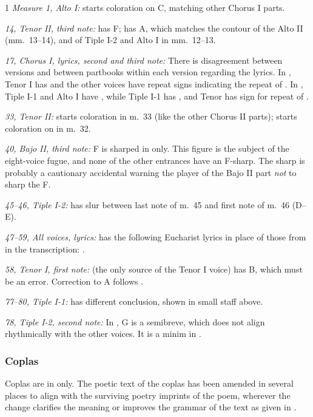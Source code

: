 \bigskip
\begin{hangparas}{\myparindent}{1}
%
\emph{Measure 1, Alto I: } 
 starts coloration on C, matching other Chorus I parts.

\emph{14, Tenor II, third note: } 
 has F;  has A, which matches the contour of the Alto II (mm.~13--14), and of Tiple I-2 and Alto I in mm.~12--13.

\emph{17, Chorus I, lyrics, second and third note: } 
There is disagreement between versions and between partbooks within each version regarding the lyrics.
In , Tenor I has  and the other voices have repeat signs indicating the repeat of .
In , Tiple I-1 and Alto I have , while Tiple I-1 has , and Tenor has sign for repeat of .

\emph{33, Tenor II: }
 starts coloration in m.~33 (like the other Chorus II parts);  starts coloration on  in m.~32.

\emph{40, Bajo II, third note: }
F is sharped in  only. 
This figure is the subject of the eight-voice fugue, and none of the other entrances have an F-sharp. 
The sharp is probably a cautionary accidental warning the player of the Bajo II part \emph{not} to sharp the F.

\emph{45--46, Tiple I-2: }
 has slur between last note of m.~45 and first note of m.~46 (D--E).

\emph{47--59, All voices, lyrics: }
 has the following Eucharist lyrics in place of those from  in the transcription: . 

\emph{58, Tenor I, first note: }
 (the only source of the Tenor I voice) has B, which must be an error. Correction to A follows .

\emph{77--80, Tiple I-1: }
 has different conclusion, shown in small staff above.

\emph{78, Tiple I-2, second note: }
In , G is a semibreve, which does not align rhythmically with the other voices. It is a minim in .
%
\end{hangparas}

\subsubsection*{%
Coplas}

Coplas are in  only. 
The poetic text of the coplas has been amended in several places to align with the surviving poetry imprints of the poem, wherever the change clarifies the meaning or improves the grammar of the text as given in .

